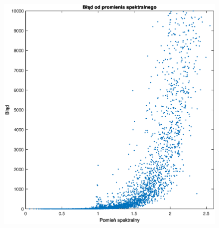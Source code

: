 \documentclass[12pt]{article}
\begin{document}
\begin{figure}[H]
    \centering
    \includegraphics[width=450pt]{graph1.eps}

    \label{label}
\end{figure}
\end{document}

